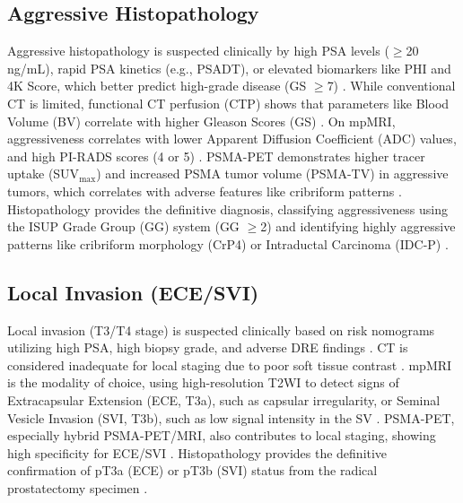 \documentclass[11pt, a4paper]{article}
\begin{document}
\subsection{Aggressive Histopathology}
Aggressive histopathology is suspected clinically by high PSA levels ($\geq$20 ng/mL), rapid PSA kinetics (e.g., PSADT), or elevated biomarkers like PHI and 4K Score, which better predict high-grade disease (GS $\geq$7) \cite{BalzsAntal2021}. While conventional CT is limited, functional CT perfusion (CTP) shows that parameters like Blood Volume (BV) correlate with higher Gleason Scores (GS) \cite{HuellnerPauli2014}. On mpMRI, aggressiveness correlates with lower Apparent Diffusion Coefficient (ADC) values, and high PI-RADS scores (4 or 5) \cite{GinsburgRusu2014,BertelliMercatelli2022}. PSMA-PET demonstrates higher tracer uptake (SUV$_{\text{max}}$) and increased PSMA tumor volume (PSMA-TV) in aggressive tumors, which correlates with adverse features like cribriform patterns \cite{VetroneMei2023,ShiYu2024}. Histopathology provides the definitive diagnosis, classifying aggressiveness using the ISUP Grade Group (GG) system (GG $\geq$2) and identifying highly aggressive patterns like cribriform morphology (CrP4) or Intraductal Carcinoma (IDC-P) \cite{DuenwegFang2022}.

\subsection{Local Invasion (ECE/SVI)}
Local invasion (T3/T4 stage) is suspected clinically based on risk nomograms utilizing high PSA, high biopsy grade, and adverse DRE findings \cite{OliveiraFerreira2023}. CT is considered inadequate for local staging due to poor soft tissue contrast \cite{MarinescuSpohn2022}. mpMRI is the modality of choice, using high-resolution T2WI to detect signs of Extracapsular Extension (ECE, T3a), such as capsular irregularity, or Seminal Vesicle Invasion (SVI, T3b), such as low signal intensity in the SV \cite{OliveiraFerreira2023,CaglicKovac2019}. PSMA-PET, especially hybrid PSMA-PET/MRI, also contributes to local staging, showing high specificity for ECE/SVI \cite{GaoZhang2019,HvittfeldtHedeer2025}. Histopathology provides the definitive confirmation of pT3a (ECE) or pT3b (SVI) status from the radical prostatectomy specimen \cite{ErbayOzden2020}.
\end{document}

